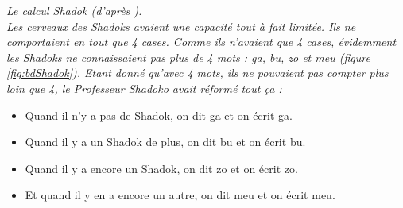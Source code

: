 \begin{td}\label{td:shadok}\em Le calcul Shadok (d'après \cite{rouxel}).\\
Les cerveaux des Shadoks avaient une capacité tout à fait limitée.
Ils ne comportaient en tout que 4 cases.
Comme ils n'avaient que 4 cases, évidemment les Shadoks ne connaissaient 
pas plus de 4 mots :  {\sc ga, bu, zo et meu} (figure \ref{fig:bdShadok}).
Etant donné qu'avec 4 mots, ils ne pouvaient pas compter plus loin que 4,
le Professeur Shadoko avait réformé tout ça :
\begin{itemize}
\item Quand il n'y a pas de Shadok, on dit {\sc ga} et on écrit {\sc ga}.
\item Quand il y a un Shadok de plus, on dit {\sc bu} et on écrit {\sc bu}.
\item Quand il y a encore un Shadok, on dit {\sc zo} et on écrit {\sc zo}.
\item Et quand il y en a encore un autre, on dit {\sc meu} et on écrit {\sc meu}.
\end{itemize}


\end{td}
